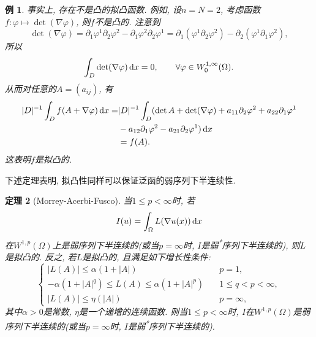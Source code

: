 \documentclass[12pt,a4paper]{article}
\newtheorem{theorem}{定理}[section]
\newtheorem{example}[theorem]{例}
\begin{document}
\begin{example}
    事实上, 存在不是凸的拟凸函数. 例如, 设$n = N = 2$, 考虑函数$f\colon \varphi \mapsto \det(\nabla\varphi)$, 则$f$不是凸的.
    注意到 
    \begin{equation*}
        \det(\nabla\varphi) = \partial_1\varphi^1\partial_2\varphi^2 - \partial_1\varphi^2\partial_2\varphi^1 = \partial_1(\varphi^1\partial_2\varphi^2) - \partial_2(\varphi^1\partial_1\varphi^2), 
    \end{equation*}
    所以 
    \begin{equation*}
        \int_D\det(\nabla\varphi) \,{\rm d}x = 0, \qquad \forall \varphi \in W_0^{1, \infty}(\Omega).
    \end{equation*}
    从而对任意的$A = (a_{ij})$, 有 
    \begin{align*}
        |D|^{-1}\int_Df(A + \nabla\varphi) \,{\rm d}x = &|D|^{-1}\int_D(\det A + \det(\nabla\varphi) + a_{11}\partial_2\varphi^2 + a_{22}\partial_1\varphi^1 \\
        &- a_{12}\partial_1\varphi^2 - a_{21}\partial_2\varphi^1) \,{\rm d}x \\ 
        &= f(A).
    \end{align*}
    这表明$f$是拟凸的.
\end{example}

下述定理表明, 拟凸性同样可以保证泛函的弱序列下半连续性.

\begin{theorem}[Morrey-Acerbi-Fusco]
    当$1 \leq p < \infty$时, 若 
    \begin{equation*}
        I(u) = \int_{\Omega}L(\nabla u(x)) \,{\rm d}x
    \end{equation*}
    在$W^{1, p}(\Omega)$上是弱序列下半连续的(或当$p = \infty$时, $I$是弱\textsuperscript{*}序列下半连续的), 则$L$是拟凸的.
    反之, 若$L$是拟凸的, 且满足如下增长性条件:
    \begin{equation*}
        \begin{cases}
            |L(A)| \leq \alpha(1 + |A|) \quad &p = 1, \\ 
            -\alpha(1 + |A|^q) \leq L(A) \leq \alpha(1 + |A|^p) \quad &1 \leq q < p < \infty, \\
            |L(A)| \leq \eta(|A|) \quad &p = \infty,
        \end{cases}
    \end{equation*}
    其中$\alpha > 0$是常数, $\eta$是一个递增的连续函数. 则当$1 \leq p < \infty$时, $I$在$W^{1, p}(\Omega)$是弱序列下半连续的(或当$p = \infty$时, $I$是弱\textsuperscript{*}序列下半连续的).
\end{theorem}
\end{document}
